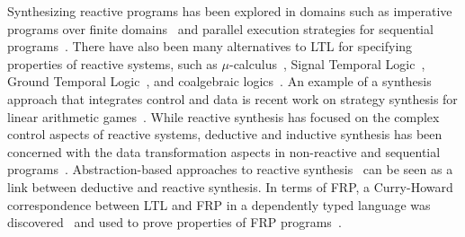 Synthesizing reactive programs has been explored in domains such as imperative programs over finite domains~\cite{madhusudan2011synthesizing} and parallel execution strategies for sequential programs~\cite{conf/fmcad/BloemHKKAS14}.
There have also been many alternatives to LTL for specifying properties of reactive systems, such as $ \mu$-calculus~\cite{Kupferman:2000}, Signal Temporal Logic~\cite{hscc/sanjit15}, Ground Temporal Logic~\cite{cyrluk1994ground}, and coalgebraic logics~\cite{bonsangue2008coalgebraic}.
An example of a synthesis approach that integrates control and data is recent work on strategy synthesis for linear arithmetic games~\cite{Farzan:2017}.
While reactive synthesis has focused on the complex control aspects of reactive systems,
  deductive and inductive synthesis has been concerned with the data transformation aspects in non-reactive and sequential programs~\cite{vechevYY13,kuncak2010complete,osera2015type,solarLezama13,Feser:2015:SDS:2737924.2737977,Isil17}.
Abstraction-based approaches to reactive synthesis~\cite{Beyene:2014:CAS:2535838.2535860,Dimitrova2012,hsu2018multi,mallik2016compositional} can be seen as a link between deductive and reactive synthesis.
In terms of FRP, a Curry-Howard correspondence between LTL and FRP in a dependently typed language was discovered~\cite{plpv/Jeffrey12,jeltsch2012towards} and used to prove properties of FRP programs~\cite{Cave2014Fair,krishnaswami2013higher}.
